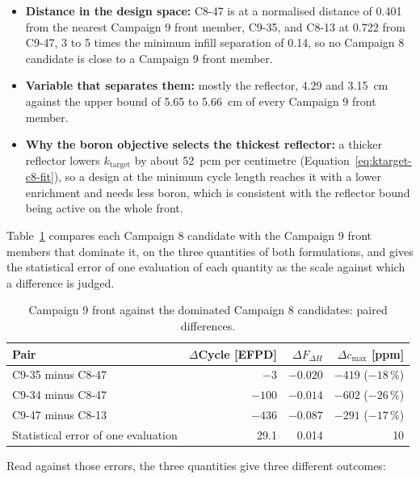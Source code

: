 \begin{itemize}
  \item \textbf{Distance in the design space:} C8-47 is at a normalised
        distance of 0.401 from the nearest Campaign 9 front member,
        C9-35, and C8-13 at 0.722 from C9-47, 3 to 5 times the minimum
        infill separation of 0.14, so no Campaign 8 candidate is close
        to a Campaign 9 front member.
  \item \textbf{Variable that separates them:} mostly the reflector,
        4.29 and \SI{3.15}{cm} against the upper bound of 5.65 to
        \SI{5.66}{cm} of every Campaign 9 front member.
  \item \textbf{Why the boron objective selects the thickest
        reflector:} a thicker reflector lowers $k_\mathrm{target}$ by
        about \SI{52}{pcm} per centimetre
        (Equation~\eqref{eq:ktarget-c8-fit}), so a design at the minimum
        cycle length reaches it with a lower enrichment and needs less
        boron, which is consistent with the reflector bound being
        active on the whole front.
\end{itemize}

Table~\ref{tab:c8-c9-pairs} compares each Campaign 8 candidate with the
Campaign 9 front members that dominate it, on the three quantities of
both formulations, and gives the statistical error of one evaluation of
each quantity as the scale against which a difference is judged.

\begin{table}[!htb]
  \centering
  \caption{Campaign 9 front against the dominated Campaign 8 candidates: paired differences.}
  \label{tab:c8-c9-pairs}
  \small
  \begin{tabular}{@{}lrrr@{}}
    \toprule
    Pair & $\Delta$Cycle [EFPD] & $\Delta F_{\Delta H}$ & $\Delta c_\mathrm{max}$ [ppm] \\
    \midrule
    C9-35 minus C8-47 & $-3$   & $-0.020$ & $-419$ ($-18\,\%$) \\
    C9-34 minus C8-47 & $-100$ & $-0.014$ & $-602$ ($-26\,\%$) \\
    C9-47 minus C8-13 & $-436$ & $-0.087$ & $-291$ ($-17\,\%$) \\
    \midrule
    Statistical error of one evaluation & 29.1 & 0.014 & 10 \\
    \bottomrule
  \end{tabular}
\end{table}

Read against those errors, the three quantities give three different
outcomes:

